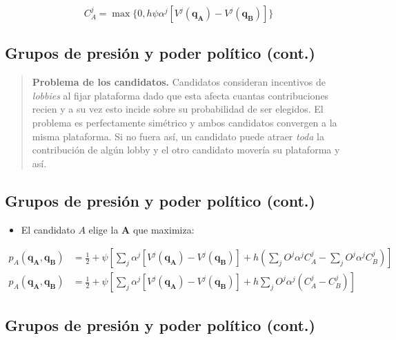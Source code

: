 \documentclass[
  letterpaper,
  DIV=11,
  numbers=noendperiod]{scrartcl}
\providecommand{\tightlist}{%
  \setlength{\itemsep}{0pt}\setlength{\parskip}{0pt}}\usepackage{longtable,booktabs,array}
\begin{document}
\begin{equation}
C^{j}_{A}=\max
\{0,h\psi\alpha^{j}[V^{j}(\mathbf{q_{A}})-V^{j}(\mathbf{q_{B}})]\}
\end{equation}

\subsection{Grupos de presión y poder político
(cont.)}\label{grupos-de-presiuxf3n-y-poder-poluxedtico-cont.-6}

\begin{quote}
\textbf{Problema de los candidatos.} Candidatos consideran incentivos de
\emph{lobbies} al fijar plataforma dado que esta afecta cuantas
contribuciones recien y a su vez esto incide sobre su probabilidad de
ser elegidos. El problema es perfectamente simétrico y ambos candidatos
convergen a la misma plataforma. Si no fuera así, un candidato puede
atraer \emph{toda} la contribución de algún lobby y el otro candidato
movería su plataforma y así.
\end{quote}

\subsection{Grupos de presión y poder político
(cont.)}\label{grupos-de-presiuxf3n-y-poder-poluxedtico-cont.-7}

\begin{itemize}
\tightlist
\item
  El candidato \(A\) elige la \(\mathbf{A}\) que maximiza:
\end{itemize}

\begin{align}
p_{A}(\mathbf{q_{A}},\mathbf{q_{B}})&=\frac{1}{2}+\psi
    \left[\sum_{j}\alpha^{j}[V^{j}(\mathbf{q_{A}})-V^{j}(\mathbf{q_{B}})]+h(\sum_{j}O^{j}\alpha^{j}C^{j}_{A}-\sum_{j}O^{j}\alpha^{j}C^{j}_{B})\right] \\
p_{A}(\mathbf{q_{A}},\mathbf{q_{B}})&=\frac{1}{2}+\psi
    \left[\sum_{j}\alpha^{j}[V^{j}(\mathbf{q_{A}})-V^{j}(\mathbf{q_{B}})]+h\sum_{j}O^{j}\alpha^{j}(C^{j}_{A}-C^{j}_{B})\right]
\end{align}

\subsection{Grupos de presión y poder político
(cont.)}\label{grupos-de-presiuxf3n-y-poder-poluxedtico-cont.-8}
\end{document}
